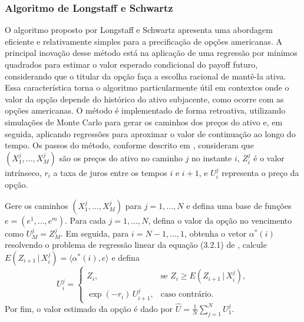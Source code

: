 \documentclass[12pt,openright,oneside,a4paper]{abntex2}
\numberwithin{equation}{section}
\begin{document}

\subsubsection{Algoritmo de Longstaff e Schwartz}

O algoritmo proposto por Longstaff e Schwartz \textcite{longstaff2001valuing} apresenta uma abordagem eficiente e relativamente simples para a precificação de opções americanas. A principal inovação desse método está na aplicação de uma regressão por mínimos quadrados para estimar o valor esperado condicional do payoff futuro, considerando que o titular da opção faça a escolha racional de mantê-la ativa. Essa característica torna o algoritmo particularmente útil em contextos onde o valor da opção depende do histórico do ativo subjacente, como ocorre com as opções americanas. O método é implementado de forma retroativa, utilizando simulações de Monte Carlo para gerar os caminhos dos preços do ativo e, em seguida, aplicando regressões para aproximar o valor de continuação ao longo do tempo. Os passos do método, conforme descrito em \textcite{silva2012}, consideram que \((X^{j}_{1}, \ldots, X^{j}_{M})\) são os preços do ativo no caminho \(j\) no instante \(i\), \(Z^{j}_{i}\) é o valor intrínseco, \(r_{i}\) a taxa de juros entre os tempos \(i\) e \(i+1\), e \(U^{j}_{i}\) representa o preço da opção.

Gere os caminhos \((X^{j}_{1}, \ldots, X^{j}_{M})\) para \(j = 1, \ldots, N\) e defina uma base de funções \(e = (e^{1}, \ldots, e^{m})\). Para cada \(j = 1, \ldots, N\), defina o valor da opção no vencimento como \(U^{j}_{M} = Z^{j}_{M}\). Em seguida, para \(i = N-1, \ldots, 1\), obtenha o vetor \(\alpha^{*}(i)\) resolvendo o problema de regressão linear da equação (3.2.1) de \textcite{silva2012}, calcule \(E(Z_{i+1} \,|\, X^{j}_{i}) = \langle \alpha^{*}(i), e \rangle\) e defina 
\[
U^{j}_{i} =
\begin{cases}
Z_{i}, & \text{se } Z_{i} \geq E(Z_{i+1} \,|\, X^{j}_{i}), \\
\exp(-r_{i}) \, U^{j}_{i+1}, & \text{caso contrário}.
\end{cases}
\]
Por fim, o valor estimado da opção é dado por \(\hat{U} = \frac{1}{N} \sum_{j=1}^{N} U^{j}_{1}\).
\end{document}
